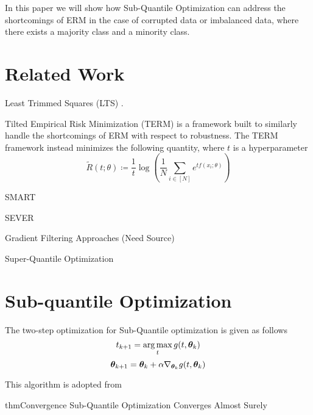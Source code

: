\documentclass{article} %
\begin{document}
	In this paper we will show how Sub-Quantile Optimization can address the shortcomings of ERM in the case of corrupted data or imbalanced data, where there exists a majority class and a minority class.
	
		
	\section{Related Work}
	Least Trimmed Squares (LTS) \cite{LTS}.
	
	Tilted Empirical Risk Minimization (TERM) \cite{li2020tilted} is a framework built to similarly handle the shortcomings of ERM with respect to robustness. The TERM framework instead minimizes the following quantity, where $t$ is a hyperparameter
	\begin{equation}
		\tilde{R}(t;\theta) \coloneqq \frac{1}{t} \log\left(\frac{1}{N}\sum_{i \in \left[N\right]}e^{tf(x_i;\theta)} \right)
	\end{equation}
	
	SMART \cite{https://doi.org/10.48550/arxiv.2206.04777}
	
	SEVER \cite{DiakonikolasKKLSS19}
	
	Gradient Filtering Approaches (Need Source)
	
	Super-Quantile Optimization \cite{ROCKAFELLAR2014140}
			
	\section{Sub-quantile Optimization}
	\label{headings}
	
	The two-step optimization for Sub-Quantile optimization is given as follows 
	\begin{equation}
		\label{eqn:t-update}
		t_{k+1} = \operatorname*{arg\,max}_t g(t,{\bm{\theta}}_k) 
	\end{equation}
	\begin{equation}
		\label{eqn:theta-update}
		{\bm{\theta}}_{k+1} = {\bm{\theta}}_k + \alpha \nabla_{{\bm{\theta}}_k} g(t,{\bm{\theta}}_k)
	\end{equation}
		
	This algorithm is adopted from \cite{Razaviyayn}
		
	\begin{restatable}{thm}{Convergence}
		\label{thm:convergence}
		Sub-Quantile Optimization Converges Almost Surely
	\end{restatable}
	
\end{document}
